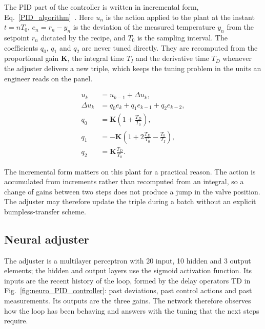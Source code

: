 The PID part of the controller is written in incremental form,
Eq.~\ref{PID_algorithm}~\cite{ivaniuk2013neuro}. Here $u_n$ is the action
applied to the plant at the instant $t = n T_0$, $e_n = r_n - y_n$ is the
deviation of the measured temperature $y_n$ from the setpoint $r_n$ dictated by
the recipe, and $T_0$ is the sampling interval. The coefficients $q_0$, $q_1$
and $q_2$ are never tuned directly. They are recomputed from the proportional
gain $\mathbf{K}$, the integral time $T_I$ and the derivative time $T_D$
whenever the adjuster delivers a new triple, which keeps the tuning problem in
the units an engineer reads on the panel.

\begin{equation}\label{PID_algorithm}
  \begin{aligned}
    u_k  & = u_{k - 1} + \Delta u_k,                                         \\
    \Delta u_k & = q_0 e_k + q_1 e_{k - 1} + q_2 e_{k - 2},                  \\
    q_0  & = \mathbf{K}\left(1 + \frac{T_D}{T_0}\right),                     \\
    q_1  & = -\mathbf{K}\left(1 + 2\frac{T_D}{T_0} - \frac{T_0}{T_I}\right), \\
    q_2  & = \mathbf{K}\frac{T_D}{T_0}.
  \end{aligned}
\end{equation}

The incremental form matters on this plant for a practical reason. The action is
accumulated from increments rather than recomputed from an integral, so a change
of gains between two steps does not produce a jump in the valve position. The
adjuster may therefore update the triple during a batch without an explicit
bumpless-transfer scheme.

\subsection{Neural adjuster}

The adjuster is a multilayer perceptron with 20 input, 10 hidden and 3 output
elements; the hidden and output layers use the sigmoid activation function. Its
inputs are the recent history of the loop, formed by the delay operators TD in
Fig.~\ref{fig:neuro_PID_controller}: past deviations, past control actions and
past measurements. Its outputs are the three gains. The network therefore
observes how the loop has been behaving and answers with the tuning that the
next steps require.

